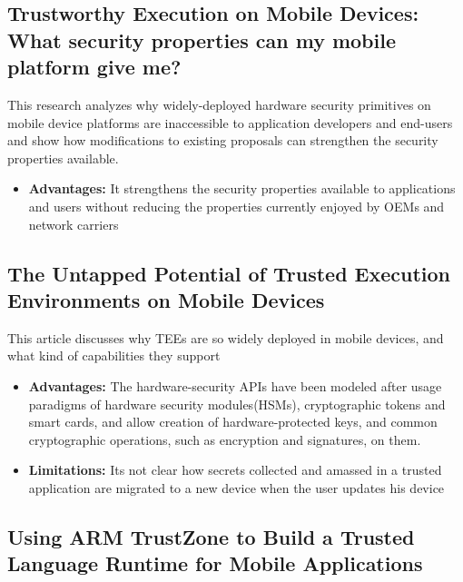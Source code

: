 \documentclass[conference]{IEEEtran}
\begin{document}
\subsection{Trustworthy Execution on Mobile Devices: What security properties can my mobile platform give me?}

\cite{mobile4} This research analyzes why widely-deployed hardware security primitives on mobile device platforms are inaccessible to application developers and end-users and show how modifications to existing proposals can strengthen the security properties available.
\begin{itemize}
    \item \textbf{Advantages:} It strengthens the security properties available to applications and users without reducing the properties currently enjoyed by OEMs and network carriers
\end{itemize}


\subsection{The Untapped Potential of Trusted Execution Environments on Mobile Devices}
\cite{mobile5} This article discusses why TEEs are so widely deployed in mobile devices, and what kind of capabilities they support
\begin{itemize}
    \item \textbf{Advantages:} The hardware-security APIs have been modeled after usage paradigms of hardware security modules(HSMs), cryptographic tokens and smart cards, and allow creation of hardware-protected keys, and common cryptographic operations, such as encryption and signatures, on them.
    \item \textbf{Limitations:} Its not clear how secrets collected and amassed in a trusted application are migrated to a new device when the user updates his device
\end{itemize}


\subsection{Using ARM TrustZone to Build a Trusted Language Runtime for Mobile Applications}
\end{document}
